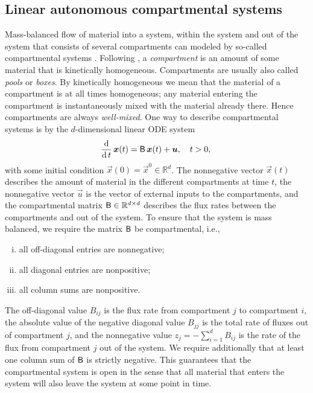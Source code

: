 \documentclass[smallextended]{svjour3}
\newcommand{\R}{\mathbb{R}}
\newcommand{\deriv}[1]{\frac{\operatorname{d}}{\operatorname{d}#1}}
\begin{document}
\subsection{Linear autonomous compartmental systems}\label{sec:one_particle}
Mass-balanced flow of material into a system, within the system and out of the system that consists of several compartments can modeled by so-called compartmental systems \citep{Anderson1983}.
Following \citet{Jacquez1993SIAM}, a \emph{compartment} is an amount of some material that is kinetically homogeneous.
Compartments are usually also called \emph{pools} or \emph{boxes}.
By kinetically homogeneous we mean that the material of a compartment is at all times homogeneous; any material entering the compartment is instantaneously mixed with the material already there.
Hence compartments are always \emph{well-mixed}.
One way to describe compartmental systems is by the $d$-dimensional linear ODE system
\begin{equation}\label{eqn:lin_CS_sys}
  \deriv{t}\,\vec{x}(t) = \tens{B}\,\vec{x}(t) + \vec{u},\quad t>0,\\
\end{equation}
with some initial condition $\vec{x}(0) = \vec{x}^0\in\R^d$.
The nonnegative vector $\vec{x}(t)$ describes the amount of material in the different compartments at time $t$, the nonnegative vector $\vec{u}$ is the vector of external inputs to the compartments, and the compartmental matrix $\tens{B}\in\R^{d\times d}$ describes the flux rates between the compartments and out of the system.
To ensure that the system is mass balanced, we require the matrix $\mathsf{B}$ be compartmental, i.e., 
\begin{enumerate}[(i)]
    \item all off-diagonal entries are nonnegative;
    \item all diagonal entries are nonpositive;
    \item all column sums are nonpositive.
\end{enumerate}
The off-diagonal value $B_{ij}$ is the flux rate from compartment $j$ to compartment $i$, the absolute value of the negative diagonal value $B_{jj}$ is the total rate of fluxes out of compartment $j$, and the nonnegative value $z_j=-\sum_{i=1}^d B_{ij}$ is the rate of the flux from compartment $j$ out of the system.
We require additionally that at least one column sum of $\mathsf{B}$ is strictly negative.
This guarantees that the compartmental system is open in the sense that all material that enters the system will also leave the system at some point in time.
\end{document}
